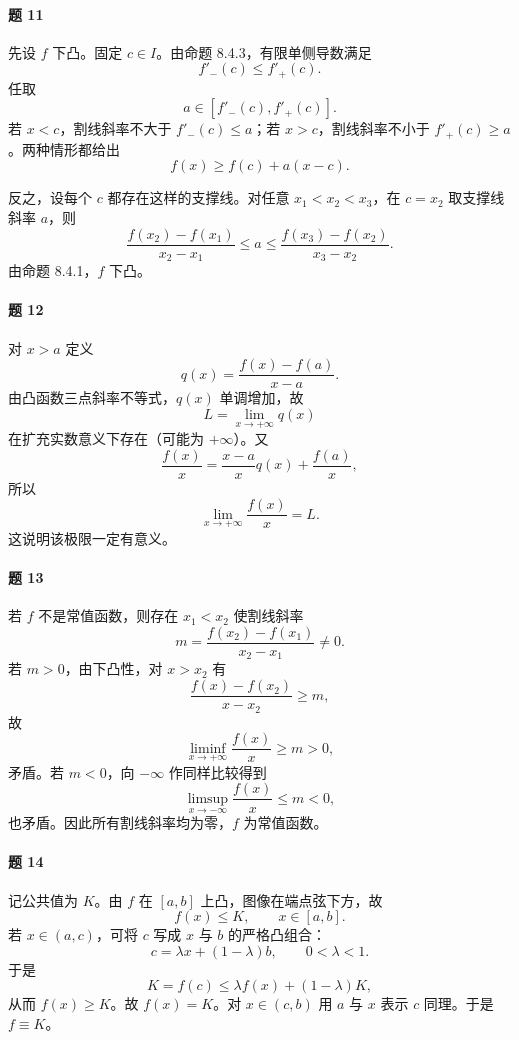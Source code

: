 \paragraph{题 11}
\begin{xsolution}
先设 $f$ 下凸。固定 $c\in I$。由命题 8.4.3，有限单侧导数满足
\[
  f'_-(c)\le f'_+(c).
\]
任取
\[
  a\in[f'_-(c),f'_+(c)].
\]
若 $x<c$，割线斜率不大于 $f'_-(c)\le a$；若 $x>c$，割线斜率不小于 $f'_+(c)\ge a$。两种情形都给出
\[
  f(x)\ge f(c)+a(x-c).
\]

反之，设每个 $c$ 都存在这样的支撑线。对任意 $x_1<x_2<x_3$，在 $c=x_2$ 取支撑线斜率 $a$，则
\[
  \frac{f(x_2)-f(x_1)}{x_2-x_1}\le a
  \le\frac{f(x_3)-f(x_2)}{x_3-x_2}.
\]
由命题 8.4.1，$f$ 下凸。
\end{xsolution}

\paragraph{题 12}
\begin{xsolution}
对 $x>a$ 定义
\[
  q(x)=\frac{f(x)-f(a)}{x-a}.
\]
由凸函数三点斜率不等式，$q(x)$ 单调增加，故
\[
  L=\lim_{x\to+\infty}q(x)
\]
在扩充实数意义下存在（可能为 $+\infty$）。又
\[
  \frac{f(x)}x=\frac{x-a}{x}q(x)+\frac{f(a)}x,
\]
所以
\[
  \lim_{x\to+\infty}\frac{f(x)}x=L.
\]
这说明该极限一定有意义。
\end{xsolution}

\paragraph{题 13}
\begin{xsolution}
若 $f$ 不是常值函数，则存在 $x_1<x_2$ 使割线斜率
\[
  m=\frac{f(x_2)-f(x_1)}{x_2-x_1}\ne0.
\]
若 $m>0$，由下凸性，对 $x>x_2$ 有
\[
  \frac{f(x)-f(x_2)}{x-x_2}\ge m,
\]
故
\[
  \liminf_{x\to+\infty}\frac{f(x)}x\ge m>0,
\]
矛盾。若 $m<0$，向 $-\infty$ 作同样比较得到
\[
  \limsup_{x\to-\infty}\frac{f(x)}x\le m<0,
\]
也矛盾。因此所有割线斜率均为零，$f$ 为常值函数。
\end{xsolution}

\paragraph{题 14}
\begin{xsolution}
记公共值为 $K$。由 $f$ 在 $[a,b]$ 上凸，图像在端点弦下方，故
\[
  f(x)\le K,\qquad x\in[a,b].
\]
若 $x\in(a,c)$，可将 $c$ 写成 $x$ 与 $b$ 的严格凸组合：
\[
  c=\lambda x+(1-\lambda)b,\qquad0<\lambda<1.
\]
于是
\[
  K=f(c)\le\lambda f(x)+(1-\lambda)K,
\]
从而 $f(x)\ge K$。故 $f(x)=K$。对 $x\in(c,b)$ 用 $a$ 与 $x$ 表示 $c$ 同理。于是 $f\equiv K$。
\end{xsolution}

